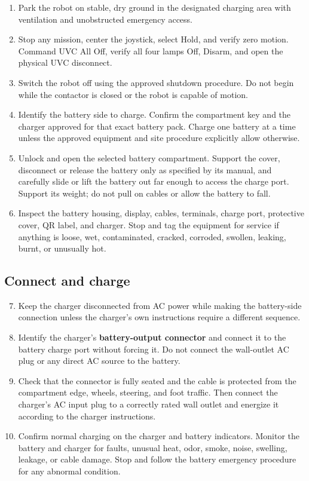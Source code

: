 \documentclass[
  10pt,
  letterpaper,
  openany]{report}
\providecommand{\tightlist}{%
  \setlength{\itemsep}{0pt}\setlength{\parskip}{0pt}}
\begin{document}
\begin{enumerate}
\tightlist
\item
  Park the robot on stable, dry ground in the designated charging area
  with ventilation and unobstructed emergency access.
\item
  Stop any mission, center the joystick, select Hold, and verify zero
  motion. Command UVC All Off, verify all four lamps Off, Disarm, and
  open the physical UVC disconnect.
\item
  Switch the robot off using the approved shutdown procedure. Do not
  begin while the contactor is closed or the robot is capable of motion.
\item
  Identify the battery side to charge. Confirm the compartment key and
  the charger approved for that exact battery pack. Charge one battery
  at a time unless the approved equipment and site procedure explicitly
  allow otherwise.
\item
  Unlock and open the selected battery compartment. Support the cover,
  disconnect or release the battery only as specified by its manual, and
  carefully slide or lift the battery out far enough to access the
  charge port. Support its weight; do not pull on cables or allow the
  battery to fall.
\item
  Inspect the battery housing, display, cables, terminals, charge port,
  protective cover, QR label, and charger. Stop and tag the equipment
  for service if anything is loose, wet, contaminated, cracked,
  corroded, swollen, leaking, burnt, or unusually hot.
\end{enumerate}

\subsection{Connect and charge}\label{connect-and-charge}

\begin{enumerate}
\setcounter{enumi}{6}
\tightlist
\item
  Keep the charger disconnected from AC power while making the
  battery-side connection unless the charger's own instructions require
  a different sequence.
\item
  Identify the charger's \textbf{battery-output connector} and connect
  it to the battery charge port without forcing it. Do not connect the
  wall-outlet AC plug or any direct AC source to the battery.
\item
  Check that the connector is fully seated and the cable is protected
  from the compartment edge, wheels, steering, and foot traffic. Then
  connect the charger's AC input plug to a correctly rated wall outlet
  and energize it according to the charger instructions.
\item
  Confirm normal charging on the charger and battery indicators. Monitor
  the battery and charger for faults, unusual heat, odor, smoke, noise,
  swelling, leakage, or cable damage. Stop and follow the battery
  emergency procedure for any abnormal condition.
\end{enumerate}
\end{document}
